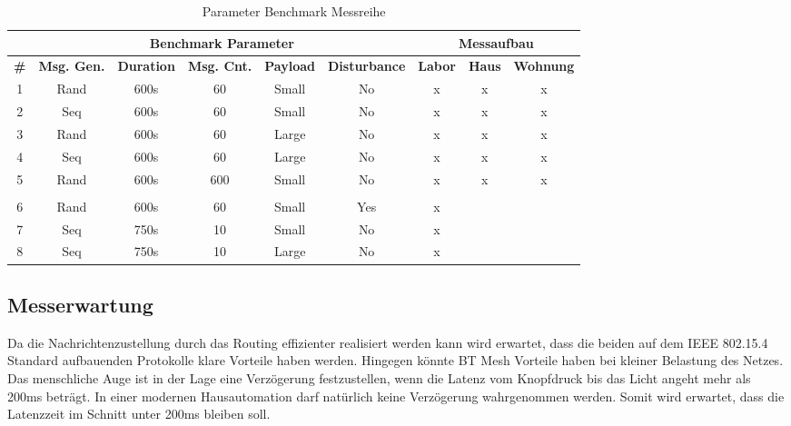 \vspace{-1pt}
\begin{table}[h]
	\centering
	\begin{adjustbox}{width=1\textwidth}
		\begin{tabular}{|c|c|c|c|c|c|c|c|c|} 
			\cline{2-9}
			\multicolumn{1}{c|}{} & \multicolumn{5}{c|}{Benchmark Parameter} & \multicolumn{3}{c|}{Messaufbau} \\ 
			\hline
			\textbf{\#}  & \textbf{Msg. Gen.}  & \textbf{Duration} & \textbf{Msg. Cnt.}  & \textbf{Payload }  & \textbf{Disturbance}  & \textbf{Labor}  & \textbf{Haus}  & \textbf{Wohnung}  \\ 
			\hline
			1 & Rand & 600s & 60 & Small & No & x & x & x \\ 
			\hline
			2 & Seq & 600s & 60 & Small & No & x & x & x \\ 
			\hline
			3 & Rand & 600s & 60 & Large & No & x & x & x \\ 
			\hline
			4 & Seq & 600s & 60 & Large & No & x & x & x \\ 
			\hline
			5 & Rand & 600s & 600 & Small & No & x & x & x \\ 
			\hline
			\multicolumn{1}{c}{} & \multicolumn{1}{c}{} & \multicolumn{1}{c}{} & \multicolumn{1}{c}{} & \multicolumn{1}{c}{} & \multicolumn{1}{c}{} & \multicolumn{1}{c}{} & \multicolumn{1}{c}{} & \multicolumn{1}{c}{} \\ 
			\hline
			6 & Rand & 600s & 60 & Small & Yes & x &  &  \\ 
			\hline
			7 & Seq & 750s & 10 & Small & No & x &  &  \\ 
			\hline
			8 & Seq & 750s & 10 & Large & No & x &  &  \\
			\hline
		\end{tabular}
	\end{adjustbox}
	\caption{Parameter Benchmark Messreihe}
	\label{tab:ParameterBenchmarkMessreihe}
\end{table}
\vspace{-20pt}
\subsection{Messerwartung}
Da die Nachrichtenzustellung durch das Routing effizienter realisiert werden kann wird erwartet, dass die beiden auf dem IEEE 802.15.4 Standard aufbauenden Protokolle klare Vorteile haben werden. Hingegen könnte BT Mesh Vorteile haben bei kleiner Belastung des Netzes. Das menschliche Auge ist in der Lage eine Verzögerung festzustellen, wenn die Latenz vom Knopfdruck bis das Licht angeht mehr als 200ms beträgt. In einer modernen Hausautomation darf natürlich keine Verzögerung wahrgenommen werden. Somit wird erwartet, dass die Latenzzeit im Schnitt unter 200ms bleiben soll. \cite{silicon_laboratories_inc_an1142_2020}